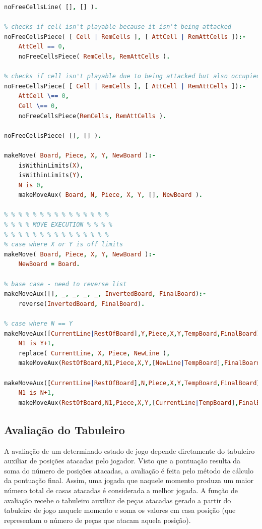 \documentclass[a4paper]{article}
\begin{document}
\begin{small}
\begin{lstlisting}[language=Prolog]
noFreeCellsLine( [], [] ).

% checks if cell isn't playable because it isn't being attacked
noFreeCellsPiece( [ Cell | RemCells ], [ AttCell | RemAttCells ]):-
	AttCell == 0,
	noFreeCellsPiece( RemCells, RemAttCells ).

% checks if cell isn't playable due to being attacked but also occupied
noFreeCellsPiece( [ Cell | RemCells ], [ AttCell | RemAttCells ]):-
	AttCell \== 0,
	Cell \== 0,
	noFreeCellsPiece(RemCells, RemAttCells ).

noFreeCellsPiece( [], [] ).

makeMove( Board, Piece, X, Y, NewBoard ):-
	isWithinLimits(X),
	isWithinLimits(Y),
	N is 0,
	makeMoveAux( Board, N, Piece, X, Y, [], NewBoard ).

% % % % % % % % % % % % % % %
% % % % MOVE EXECUTION % % % %
% % % % % % % % % % % % % % %
% case where X or Y is off limits
makeMove( Board, Piece, X, Y, NewBoard ):-
	NewBoard = Board.

% base case - need to reverse list
makeMoveAux([], _, _, _, _, InvertedBoard, FinalBoard):-
	reverse(InvertedBoard, FinalBoard).

% case where N == Y
makeMoveAux([CurrentLine|RestOfBoard],Y,Piece,X,Y,TempBoard,FinalBoard):-
	N1 is Y+1,
	replace( CurrentLine, X, Piece, NewLine ),
	makeMoveAux(RestOfBoard,N1,Piece,X,Y,[NewLine|TempBoard],FinalBoard).

makeMoveAux([CurrentLine|RestOfBoard],N,Piece,X,Y,TempBoard,FinalBoard):-
	N1 is N+1,
	makeMoveAux(RestOfBoard,N1,Piece,X,Y,[CurrentLine|TempBoard],FinalBoard).
\end{lstlisting}
\end{small}

\subsection{Avaliação do Tabuleiro}
A avaliação de um determinado estado de jogo depende diretamente do tabuleiro auxiliar de posições atacadas pelo jogador.
Visto que a pontuação resulta da soma do número de posições atacadas, a avaliação é feita pelo método de cálculo da pontuação final.
Assim, uma jogada que naquele momento produza um maior número total de casas atacadas é considerada a melhor jogada.
A função de avaliação recebe o tabuleiro auxiliar de peças atacadas gerado a partir do tabuleiro de jogo naquele momento e soma os valores em casa posição (que representam o número de peças que atacam aquela posição).
\end{document}
